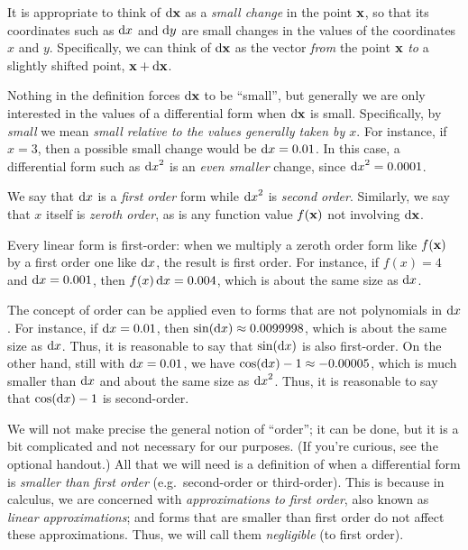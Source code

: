 \documentclass[12pt]{amsart}
\begin{document}
It is appropriate to think of ${\mathrm{d} \mathbf{x}}$ as a \emph{small change} in the point $\mathbf{x}$, so that its coordinates such as ${\mathrm{d} x}$ and ${\mathrm{d} y}$ are small changes in the values of the coordinates $x$ and $y$.
Specifically, we can think of ${\mathrm{d} \mathbf{x}}$ as the vector \emph{from} the point $\mathbf{x}$ \emph{to} a slightly shifted point, $\mathbf{x}+{\mathrm{d} \mathbf{x}}$.
\begin{center}
\end{center}
Nothing in the definition forces ${\mathrm{d} \mathbf{x}}$ to be ``small'', but generally we are only interested in the values of a differential form when ${\mathrm{d} \mathbf{x}}$ is small.
Specifically, by \emph{small} we mean \emph{small relative to the values generally taken by $x$}.
For instance, if $x=3$, then a possible small change would be ${\mathrm{d} x} = 0.01$.
In this case, a differential form such as ${\mathrm{d} x}^2$ is an \emph{even smaller} change, since ${\mathrm{d} x}^2 = 0.0001$.

We say that ${\mathrm{d} x}$ is a \emph{first order} form while ${\mathrm{d} x}^2$ is \emph{second order}.
Similarly, we say that $x$ itself is \emph{zeroth order}, as is any function value $f(\mathbf{x})$ not involving ${\mathrm{d} \mathbf{x}}$.

Every linear form is first-order: when we multiply a zeroth order form like $f(\mathbf{x})$ by a first order one like ${\mathrm{d} x}$, the result is first order.
For instance, if $f(x) = 4$ and ${\mathrm{d} x} = 0.001$, then $f(x)\,{\mathrm{d} x} = 0.004$, which is about the same size as ${\mathrm{d} x}$.

The concept of order can be applied even to forms that are not polynomials in ${\mathrm{d} x}$.
For instance, if ${\mathrm{d} x}=0.01$, then $\sin({\mathrm{d} x}) \approx 0.0099998$, which is about the same size as ${\mathrm{d} x}$.
Thus, it is reasonable to say that $\sin({\mathrm{d} x})$ is also first-order.
On the other hand, still with ${\mathrm{d} x}=0.01$, we have $\cos({\mathrm{d} x}) - 1 \approx -0.00005$, which is much smaller than ${\mathrm{d} x}$ and about the same size as ${\mathrm{d} x}^2$.
Thus, it is reasonable to say that $\cos({\mathrm{d} x}) - 1$ is second-order.

We will not make precise the general notion of ``order''; it can be done, but it is a bit complicated and not necessary for our purposes.
(If you're curious, see the optional handout.)
All that we will need is a definition of when a differential form is \emph{smaller than first order} (e.g.\ second-order or third-order).
This is because in calculus, we are concerned with \emph{approximations to first order}, also known as \emph{linear approximations}; and forms that are smaller than first order do not affect these approximations.
Thus, we will call them \emph{negligible} (to first order).
\end{document}
